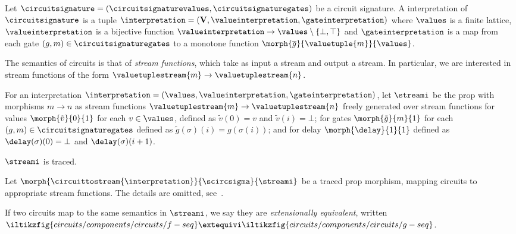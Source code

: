 \documentclass[10pt]{article}
\begin{document}
    \begin{definition}[Interpretation]\label{def:interpretation}
        Let \(\circuitsignature = (\circuitsignaturevalues,\circuitsignaturegates)\) be a circuit signature.
        A interpretation of \(\circuitsignature\) is a tuple \(\interpretation = (\mathbf{V}, \valueinterpretation,\gateinterpretation)\) where \(\values\) is a finite lattice, \(\valueinterpretation\) is a bijective function \(\valueinterpretation \to \values \setminus \{\bot,\top\}\) and \(\gateinterpretation\) is a map from each gate \((g,m) \in \circuitsignaturegates\) to a monotone function \(\morph{\overline{g}}{\valuetuple{m}}{\values}\).
    \end{definition}

    \noindent
    The semantics of circuits is that of \emph{stream functions}, which take as input a stream and output a stream.
    In particular, we are interested in stream functions of the form \(\valuetuplestream{m} \to \valuetuplestream{n}\).

    \begin{definition}
        For an interpretation \(\interpretation = (\values, \valueinterpretation, \gateinterpretation)\), let \(\streami\) be the prop with morphisms \(m \to n\) as stream functions \(\valuetuplestream{m} \to \valuetuplestream{n}\) freely generated over
        stream functions for values \(\morph{\tilde{v}}{0}{1}\) for each \(v \in \values\), defined as \(\tilde{v}(0) = v\) and \(\tilde{v}(i) = \bot\); for gates \(\morph{\tilde{g}}{m}{1}\) for each \((g,m) \in \circuitsignaturegates\) defined as \(\tilde{g}(\sigma)(i) = g(\sigma(i))\); and for delay \(\morph{\delay}{1}{1}\) defined as \(\delay(\sigma)(0) = \bot\) and \(\delay(\sigma)(i+1)\).
    \end{definition}

    \begin{theorem}
        \(\streami\) is traced.
    \end{theorem}

    \begin{definition}\label{def:circuittostreams}
        Let \(\morph{\circuittostream{\interpretation}}{\scircsigma}{\streami}\) be a traced prop morphism, mapping circuits to appropriate stream functions.
        The details are omitted, see~\cite{ghica2022full}.
    \end{definition}

    \noindent
    If two circuits map to the same semantics in \(\streami\), we say they are \emph{extensionally equivalent}, written \(\iltikzfig{circuits/components/circuits/f-seq} \extequivi \iltikzfig{circuits/components/circuits/g-seq}\).
\end{document}
